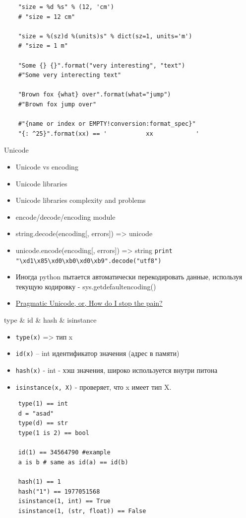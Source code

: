\documentclass{article}
\begin{document}
\vspace{15pt}
\begin{lstlisting}
	"size = %d %s" % (12, 'cm') 
	# "size = 12 cm"

	"size = %(sz)d %(units)s" % dict(sz=1, units='m') 
	# "size = 1 m"

	"Some {} {}".format("very interesting", "text")
	#"Some very interecting text"

	"Brown fox {what} over".format(what="jump")
	#"Brown fox jump over"

	#"{name or index or EMPTY!conversion:format_spec}"
	"{: ^25}".format(xx) == '           xx            '
\end{lstlisting}
\newpage

\begin{center} Unicode \end{center}
\begin{itemize}
	\item Unicode vs encoding
	\item Unicode libraries
	\item Unicode libraries complexity and problems
	\item encode/decode/encoding module
	\item string.decode(encoding[, errors]) => unicode
	\item unicode.encode(encoding[, errors]) => string
	\lstinline!print "\xd1\x85\xd0\xb0\xd0\xb9".decode("utf8")!
	\item Иногда python пытается автоматически перекодировать 
			данные, используя текущую кодировку - sys.getdefaultencoding()
	\item \href{http://www.youtube.com/watch?feature=player_embedded&v=sgHbC6udIqc}
				{Pragmatic Unicode, or, How do I stop the pain?}
\end{itemize}
\newpage

\begin{center} type \& id \& hash \& isinstance \end{center}
\begin{itemize}
	\item \lstinline!type(x)! => тип x
	\item \lstinline!id(x)! – int идентификатор значения (адрес в памяти)
	\item \lstinline!hash(x)! - int - хэш значения, широко используется внутри питона
	\item \lstinline!isinstance(x, X)! - проверяет, что x имеет тип X.
\end{itemize}
\vspace{15pt}
\begin{lstlisting}
	type(1) == int
	d = "asad"
	type(d) == str
	type(1 is 2) == bool

	id(1) == 34564790 #example
	a is b # same as id(a) == id(b)

	hash(1) == 1
	hash("1") == 1977051568
	isinstance(1, int) == True
	isinstance(1, (str, float)) == False
\end{lstlisting}
\newpage
\end{document}
